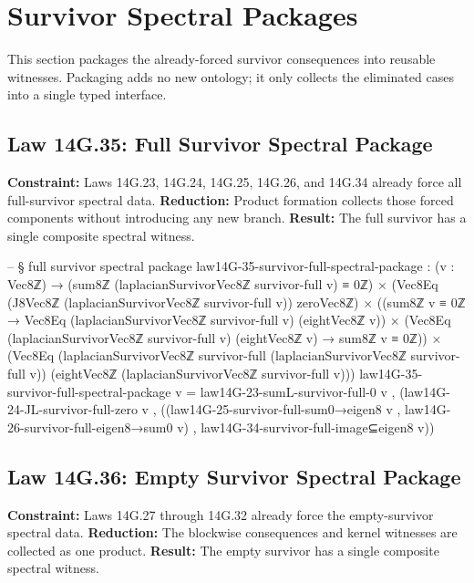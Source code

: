 \documentclass[11pt,a4paper]{book}
\begin{document}
\section{Survivor Spectral Packages}

This section packages the already-forced survivor consequences into reusable witnesses.
Packaging adds no new ontology; it only collects the eliminated cases into a single typed interface.

\subsection{Law 14G.35: Full Survivor Spectral Package}

\textbf{Constraint:} Laws 14G.23, 14G.24, 14G.25, 14G.26, and 14G.34 already force all full-survivor spectral data.
\textbf{Reduction:} Product formation collects those forced components without introducing any new branch.
\textbf{Result:} The full survivor has a single composite spectral witness.

\begin{code}
-- § full survivor spectral package
law14G-35-survivor-full-spectral-package : (v : Vec8ℤ) →
  (sum8ℤ (laplacianSurvivorVec8ℤ survivor-full v) ≡ 0ℤ) ×
  (Vec8Eq (J8Vec8ℤ (laplacianSurvivorVec8ℤ survivor-full v)) zeroVec8ℤ) ×
  ((sum8ℤ v ≡ 0ℤ → Vec8Eq (laplacianSurvivorVec8ℤ survivor-full v) (eightVec8ℤ v)) ×
   (Vec8Eq (laplacianSurvivorVec8ℤ survivor-full v) (eightVec8ℤ v) → sum8ℤ v ≡ 0ℤ)) ×
  (Vec8Eq (laplacianSurvivorVec8ℤ survivor-full (laplacianSurvivorVec8ℤ survivor-full v))
         (eightVec8ℤ (laplacianSurvivorVec8ℤ survivor-full v)))
law14G-35-survivor-full-spectral-package v =
  law14G-23-sumL-survivor-full-0 v ,
  (law14G-24-JL-survivor-full-zero v ,
   ((law14G-25-survivor-full-sum0→eigen8 v , law14G-26-survivor-full-eigen8→sum0 v) ,
    law14G-34-survivor-full-image⊆eigen8 v))
\end{code}

\subsection{Law 14G.36: Empty Survivor Spectral Package}

\textbf{Constraint:} Laws 14G.27 through 14G.32 already force the empty-survivor spectral data.
\textbf{Reduction:} The blockwise consequences and kernel witnesses are collected as one product.
\textbf{Result:} The empty survivor has a single composite spectral witness.
\end{document}
